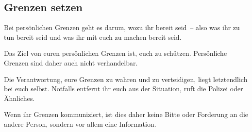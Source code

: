 \subsection{Grenzen setzen}

Bei persönlichen Grenzen geht es darum, wozu ihr bereit seid~-- also was ihr zu tun bereit seid und was ihr mit euch zu machen bereit seid.

Das Ziel von euren persönlichen Grenzen ist, euch zu schützen. Persönliche Grenzen sind daher auch nicht verhandelbar.

Die Verantwortung, eure Grenzen zu wahren und zu verteidigen, liegt letztendlich bei euch selbst. Notfalls entfernt ihr euch aus der Situation, ruft die Polizei oder Ähnliches.

Wenn ihr Grenzen kommuniziert, ist dies daher keine Bitte oder Forderung an die andere Person, sondern vor allem eine Information.
